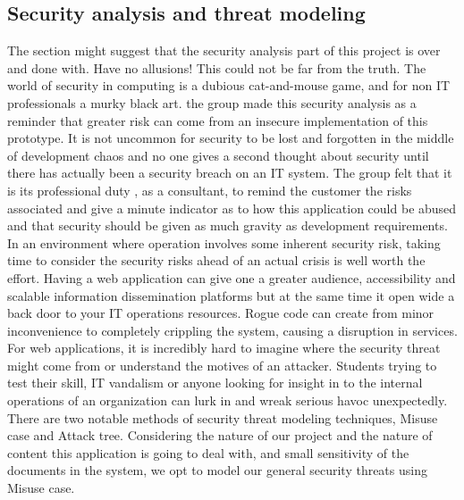 \subsection{Security analysis and threat modeling}
The section might suggest that the security analysis part of this project is over and done with. Have no allusions! This could not be far from the truth. The world of security in computing is a dubious cat-and-mouse game, and for non IT professionals a murky black art.  the group made this security analysis as a reminder that greater risk can come from an insecure implementation of this prototype. It is not uncommon for security to be lost and forgotten in the middle of development chaos and no one gives a second thought about security until there has actually been a security breach on an IT system.  The group felt that it is its professional duty , as a consultant, to  remind the customer  the risks associated and give a minute  indicator as to how this application could be abused and that security should be given as much gravity as development requirements.
\\[0.2cm]
In an environment where operation involves some inherent security risk, taking time to consider the security risks ahead of an actual crisis is well worth the effort. Having a web application can give one a greater audience, accessibility and scalable information dissemination platforms but at the same time it open wide a back door to your IT operations resources. Rogue code can create from minor inconvenience to completely crippling the system, causing a disruption in services. For web applications, it is incredibly hard to imagine where the security threat might come from or understand the motives of an attacker. Students trying to test their skill, IT vandalism or anyone looking for insight in to the internal operations of an organization can lurk in and wreak serious havoc unexpectedly.
\\[0.5cm]
There are two notable methods of security threat modeling techniques, Misuse case and Attack tree. Considering the nature of our project and the nature of content this application is going to deal with, and small sensitivity of the documents in the system, we opt to model our general security threats using Misuse case.
